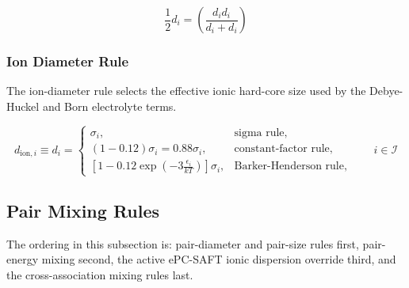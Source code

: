 \documentclass[12pt, letterpaper]{article}
\begin{document}

\begin{equation}
    \frac{1}{2}d_{i}=\left(\frac{d_{i}d_{i}}{d_{i}+d_{i}}\right)
    \label{eq:half_d_identity}
\end{equation}

\subsubsection{Ion Diameter Rule}

The ion-diameter rule selects the effective ionic hard-core size used by the Debye-Huckel and Born electrolyte terms.

\begin{equation}
    d_{\mathrm{ion},i}\equiv d_{i}=
    \begin{cases}
        \sigma_{i}, & \text{sigma rule}, \\[6pt]
        \left(1-0.12\right)\sigma_{i}=0.88\sigma_{i}, & \text{constant-factor rule}, \\[6pt]
        \left[1-0.12 \exp \left(-3 \frac{\epsilon_{i}}{k T}\right)\right]\sigma_{i}, & \text{Barker-Henderson rule},
    \end{cases}
    \qquad i\in\mathcal{I}
    \label{eq:d_ion_rule}
\end{equation}

\subsection{Pair Mixing Rules}

The ordering in this subsection is: pair-diameter and pair-size rules first, pair-energy mixing second, the active ePC-SAFT ionic dispersion override third, and the cross-association mixing rules last.
\end{document}
